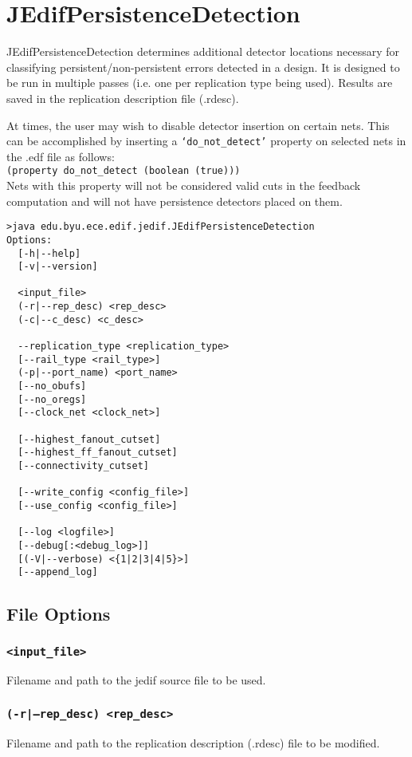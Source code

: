 \section{JEdifPersistenceDetection}
JEdifPersistenceDetection determines additional detector locations necessary
for classifying persistent/non-persistent errors detected in a design. It is
designed to be run in multiple passes (i.e. one per replication type being
used). Results are saved in the replication description file (.rdesc).

At times, the user may wish to disable detector insertion on certain nets. This
can be accomplished by inserting a \texttt{`do\_not\_detect'} property on
selected nets in the .edf file as follows:\\
\texttt{(property do\_not\_detect (boolean (true)))}\\

Nets with this property will not be considered valid cuts in the feedback
computation and will not have persistence detectors placed on them.

\begin{verbatim}
>java edu.byu.ece.edif.jedif.JEdifPersistenceDetection
Options:
  [-h|--help]
  [-v|--version]

  <input_file>
  (-r|--rep_desc) <rep_desc>
  (-c|--c_desc) <c_desc>

  --replication_type <replication_type>
  [--rail_type <rail_type>]
  (-p|--port_name) <port_name>
  [--no_obufs]
  [--no_oregs]
  [--clock_net <clock_net>]

  [--highest_fanout_cutset]
  [--highest_ff_fanout_cutset]
  [--connectivity_cutset]

  [--write_config <config_file>]
  [--use_config <config_file>]

  [--log <logfile>]
  [--debug[:<debug_log>]]
  [(-V|--verbose) <{1|2|3|4|5}>]
  [--append_log]
\end{verbatim}
\subsection{File Options}

\subsubsection{\texttt{<input\_file>}}
Filename and path to the jedif source file to be
used.

\subsubsection{\texttt{(-r|--rep\_desc) <rep\_desc>}}
Filename and path to the replication description (.rdesc) file to be modified.

